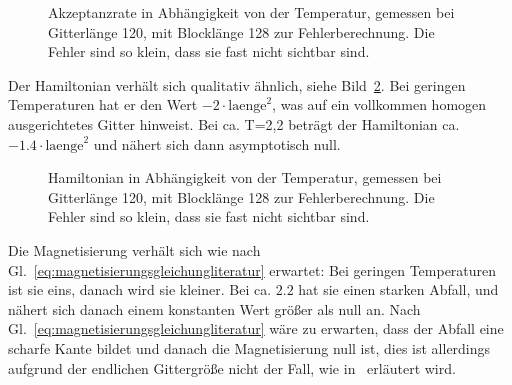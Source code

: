 	
	\begin{figure}[htbp]
		
		\caption[Akzeptanzrate in Abhängigkeit von der Temperatur]{Akzeptanzrate in Abhängigkeit von der Temperatur, gemessen bei Gitterlänge 120, mit Blocklänge 128 zur Fehlerberechnung. Die Fehler sind so klein, dass sie fast nicht sichtbar sind.}
		\label{fig:ergebnisakzeptanzrate}
	\end{figure}
	
	Der Hamiltonian verhält sich qualitativ ähnlich, siehe Bild~\ref{fig:ergebnishamiltonian}. Bei geringen Temperaturen hat er den Wert $-2\cdot\text{laenge}^2$, was auf ein vollkommen homogen ausgerichtetes Gitter hinweist. Bei ca.{} T=2,2 beträgt der Hamiltonian ca.{} $-\num{1,4}\cdot\text{laenge}^2$ und nähert sich dann asymptotisch null.
	
	
	
	
	\begin{figure}[htbp]
		
		\caption[Hamiltonian in Abhängigkeit von der Temperatur]{Hamiltonian in Abhängigkeit von der Temperatur, gemessen bei Gitterlänge 120, mit Blocklänge 128 zur Fehlerberechnung. Die Fehler sind so klein, dass sie fast nicht sichtbar sind.}
		\label{fig:ergebnishamiltonian}
	\end{figure}
	

	Die Magnetisierung verhält sich wie nach Gl.~\ref{eq:magnetisierungsgleichungliteratur} erwartet: Bei geringen Temperaturen ist sie eins, danach wird sie kleiner. Bei ca. $\num{2,2}$ hat sie einen starken Abfall, und nähert sich danach einem konstanten Wert größer als null an. Nach Gl.~\ref{eq:magnetisierungsgleichungliteratur} wäre zu erwarten, dass der Abfall eine scharfe Kante bildet und danach die Magnetisierung null ist, dies ist allerdings aufgrund der endlichen Gittergröße nicht der Fall, wie in~\cite[S. 45 f.]{binderheermann} erläutert wird.
	

